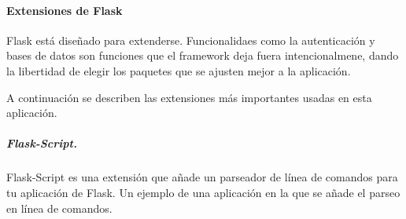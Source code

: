 


\paragraph{Extensiones de Flask}
\label{\detokenize{chapter_two/desc_cloudnao:extensiones-de-flask}}
Flask está diseñado para extenderse. Funcionalidaes como la autenticación y
bases de datos son funciones que el framework deja fuera intencionalmene,
dando la libertidad de elegir los paquetes que se ajusten mejor a la aplicación.

A continuación se describen las extensiones más importantes usadas en esta
aplicación.


\subparagraph{Flask-Script.}
\label{\detokenize{chapter_two/desc_cloudnao:flask-script}}
Flask-Script es una extensión que añade un parseador de línea de comandos
para tu aplicación de Flask. Un ejemplo de una aplicación en la que se añade
el parseo en línea de comandos.

\begin{sphinxVerbatim}[commandchars=\\\{\}]
   
    

  
   

   
\end{sphinxVerbatim}


